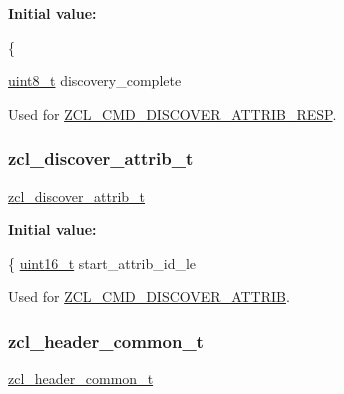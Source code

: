 {\bfseries Initial value\+:}
\begin{DoxyCode}
\{
   
   \hyperlink{group__hal__dos_gae1affc9ca37cfb624959c866a73f83c2}{uint8\_t}                   discovery\_complete
\end{DoxyCode}


Used for \hyperlink{group__zcl_gae15c30229c1d8a8cdee1bd92b2cc6a15}{Z\+C\+L\+\_\+\+C\+M\+D\+\_\+\+D\+I\+S\+C\+O\+V\+E\+R\+\_\+\+A\+T\+T\+R\+I\+B\+\_\+\+R\+E\+SP}. 

\mbox{\label{group__zcl_gab0970af8e1b078745a55523dd60bdff6}} 
\subsubsection{\texorpdfstring{zcl\+\_\+discover\+\_\+attrib\+\_\+t}{zcl\_discover\_attrib\_t}}
{\footnotesize\ttfamily \hyperlink{group__zcl_gab0970af8e1b078745a55523dd60bdff6}{zcl\+\_\+discover\+\_\+attrib\+\_\+t}}

{\bfseries Initial value\+:}
\begin{DoxyCode}
\{
   \hyperlink{group__hal__dos_ga5a8b2dc9e45a9ee81a94ef304fb62505}{uint16\_t}  start\_attrib\_id\_le
\end{DoxyCode}


Used for \hyperlink{group__zcl_ga2919d6fc8068efac4c9969938a4b9ff5}{Z\+C\+L\+\_\+\+C\+M\+D\+\_\+\+D\+I\+S\+C\+O\+V\+E\+R\+\_\+\+A\+T\+T\+R\+IB}. 

\mbox{\label{group__zcl_gaece1b64b04ac629f83358d6d815451a5}} 
\subsubsection{\texorpdfstring{zcl\+\_\+header\+\_\+common\+\_\+t}{zcl\_header\_common\_t}}
{\footnotesize\ttfamily \hyperlink{group__zcl_gaece1b64b04ac629f83358d6d815451a5}{zcl\+\_\+header\+\_\+common\+\_\+t}}

